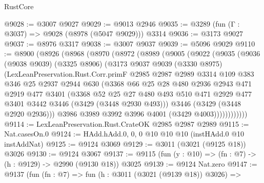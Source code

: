 \begin{lexlean}{RustCore}
\begin{coremodule}
@9028 := @3007 @9027
@9029 := @9013 @2946
@9035 := @3289 (fun (Γ : @3037) => @9028 (@8978 (@5047 @9029))) @3314
@9036 := @3173 @9027
@9037 := @8976 @3317
@9038 := @3007 @9037
@9039 := @5096 @9029
@9110 := @8900
    (@8926
      (@8968
        (@8970
          (@8972
            (@8989
              (@9005
                (@9022
                  (@9035
                    (@9036
                      (@9038 @9039)
                      (@3325 @8906)
                      (@3173
                        @9037
                        @9039
                        (@3330 @8975)
                        (LexLeanPreservation.Rust.Corr.primF
                          @2985
                          @2987
                          @2989
                          @3314
                          @109
                          @383
                          @346
                          @25
                          @2937
                          @2944
                          @630
                          (@3368
                            @66
                            @25
                            @28
                            @480
                            @2936
                            @2943
                            @471
                            @2919
                            @477
                            @3401
                            (@3368
                              @52
                              @25
                              @27
                              @480
                              @493
                              @510
                              @471
                              @2929
                              @477
                              @3401
                              @3442
                              @3446
                              (@3429 (@3448 @2930 @493)))
                            @3446
                            (@3429 (@3448 @2920 @2936)))
                          @3986
                          @3989
                          @3992
                          @3996
                          @4001
                          (@3429 @4003))))))))))))
@9114 := LexLeanPreservation.Rust.CrateOK @2985 @2987 @2989
@9115 := Nat.casesOn.{0}
@9124 := HAdd.hAdd.{0, 0, 0} @10 @10 @10 (instHAdd.{0} @10 instAddNat)
@9125 := @9124 @3069
@9129 := @3011 (@3021 (@9125 @18)) @3026
@9130 := @9124 @3067
@9137 := @9115 (fun (y : @10) => (fn : @7) -> (h : @9129) -> @2990 (@9130 @18)) @3025
@9139 := @9124 Nat.zero
@9147 := @9137
    (fun (fn : @7) =>
    fun (h : @3011 (@3021 (@9139 @18)) @3026) =>

\end{coremodule}
\end{lexlean}
